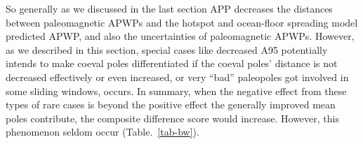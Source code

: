 So generally as we discussed in the last section APP decreases the distances
between paleomagnetic APWPs and the hotspot and ocean-floor spreading model
predicted APWP, and also the uncertainties of paleomagnetic APWPs. However, as
we described in this section, special cases like decreased A95 potentially
intends to make coeval poles differentiated if the coeval poles' distance is
not decreased effectively or even increased, or very ``bad'' paleopoles got
involved in some sliding windows, occurs. In summary, when the negative effect
from these types of rare cases is beyond the positive effect the generally
improved mean poles contribute, the composite difference score would increase.
However, this phenomenon seldom occur (Table.~\ref{tab-bw}).

\begin{table*}
\centering
\caption{One example of the Type 1 rare cases where AMP gives better similarity
  result than APP does from North America (101). Only statistically significant
  values are listed here.}
\label{tab-w3p4vs5}
\end{table*}
